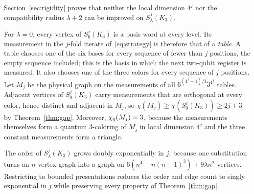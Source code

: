 Section~\ref{sec:rigidity} proves that neither the local dimension $4^j$ nor the compatibility radius $\lambda+2$ can be improved on $S^j_\lambda(K_3)$.

\begin{remark}\label{rem:tables}
For $\lambda=0$, every vertex of $S^j_0(K_3)$ is a basis word at every level. Its measurement in the $j$-fold iterate of~\eqref{eq:strategy} is therefore that of a \emph{table}. A table chooses one of the six bases for every sequence of fewer than $j$ positions, the empty sequence included; this is the basis in which the next two-qubit register is measured. It also chooses one of the three colors for every sequence of $j$ positions. Let $M_j$ be the physical graph on the measurements of all $6^{(4^j-1)/3}3^{4^j}$ tables. Adjacent vertices of $S^j_0(K_3)$ carry measurements that are orthogonal at every color, hence distinct and adjacent in $M_j$, so $\chi(M_j)\ge\chi(S^j_0(K_3))\ge2j+3$ by Theorem~\ref{thm:gap}. Moreover, $\chi_{\mathrm q}(M_j)=3$, because the measurements themselves form a quantum $3$-coloring of $M_j$ in local dimension $4^j$ and the three constant measurements form a triangle.
\end{remark}

The order of $S^j_\lambda(K_3)$ grows doubly exponentially in $j$, because one substitution turns an $n$-vertex graph into a graph on $6(n^4-n(n-1)^3)+9\lambda n^2$ vertices. Restricting to bounded presentations reduces the order and edge count to singly exponential in $j$ while preserving every property of Theorem~\ref{thm:gap}.

